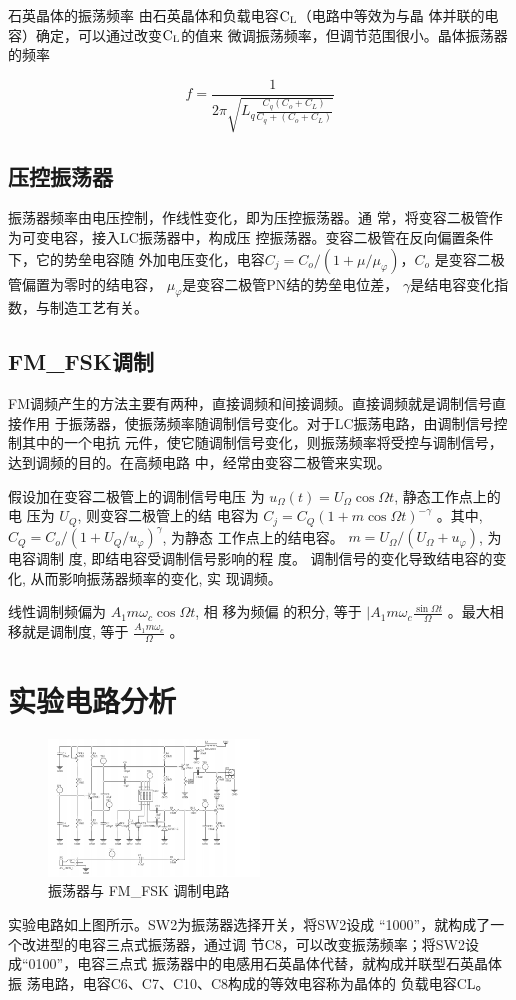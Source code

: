 \documentclass{../source/Experiment}
\begin{document}
石英晶体的振荡频率
由石英晶体和负载电容$\rm C_L$（电路中等效为与晶
体并联的电容）确定，可以通过改变$\rm C_L$的值来
微调振荡频率，但调节范围很小。晶体振荡器的频率

$$
    f = \frac{1}{2\pi\sqrt{L_q\frac{C_q(C_o+C_L)}{C_q+(C_o+C_L)}}}
$$

\subsection{压控振荡器}
振荡器频率由电压控制，作线性变化，即为压控振荡器。通
常，将变容二极管作为可变电容，接入LC振荡器中，构成压
控振荡器。变容二极管在反向偏置条件下，它的势垒电容随
外加电压变化，电容$C_j = C_o/(1+\mu/\mu_{\varphi}
    )$，$C_o$ 是变容二极管偏置为零时的结电容，
$\mu_\varphi$是变容二极管PN结的势垒电位差，
$\gamma$是结电容变化指数，与制造工艺有关。

\subsection{FM\_FSK调制}
FM调频产生的方法主要有两种，直接调频和间接调频。直接调频就是调制信号直接作用
于振荡器，使振荡频率随调制信号变化。对于LC振荡电路，由调制信号控制其中的一个电抗
元件，使它随调制信号变化，则振荡频率将受控与调制信号，达到调频的目的。在高频电路
中，经常由变容二极管来实现。

假设加在变容二极管上的调制信号电压
为 $u_{\Omega}(t)=U_{\Omega}
    \cos \Omega t$, 静态工作点上的电
压为 $U_{Q}$, 则变容二极管上的结
电容为 $C_{j}=C_{Q}(1+m \cos
    \Omega t)^{-\gamma}$ 。其中,
$C_{Q}=C_{o} /\left(1+U_{Q} /
    u_{\varphi}\right)^{\gamma}$,
为静态 工作点上的结电容。 $m=U_
    {\Omega} /\left(U_{\Omega}+u_
    {\varphi}\right)$, 为电容调制
度, 即结电容受调制信号影响的程
度。 调制信号的变化导致结电容的变
化, 从而影响振荡器频率的变化, 实
现调频。

线性调制频偏为 $A_{1} m \omega_
    {c} \cos \Omega t$, 相 移为频偏
的积分, 等于 $\mid A_{1} m
    \omega_{c} \frac{\sin \Omega t}{\Omega}$ 。最大相移就是调制度, 等于 $\frac{A_{1} m \omega_{c}}{\Omega}$ 。
\section{实验电路分析}
\begin{figure}[H]
    \centering
    \includegraphics[width = 0.5\textwidth]{lab3/7.png}
    \caption{振荡器与 FM\_FSK 调制电路}
\end{figure}
实验电路如上图所示。SW2为振荡器选择开关，将SW2设成
“1000”，就构成了一个改进型的电容三点式振荡器，通过调
节C8，可以改变振荡频率；将SW2设成“0100”，电容三点式
振荡器中的电感用石英晶体代替，就构成并联型石英晶体振
荡电路，电容C6、C7、C10、C8构成的等效电容称为晶体的
负载电容CL。
\end{document}

